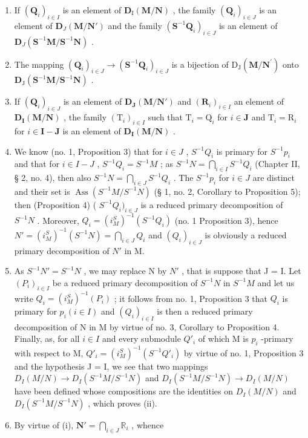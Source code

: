 \begin{enumerate}
\def\labelenumi{(\roman{enumi})}
\item
  If \((\mathbf{Q}_i)_{i\in I}\) is an element of \(\mathbf{D}_{\mathrm{I}}(\mathbf{M} / \mathbf{N})\) , the family \((\mathbf{Q}_i)_{i\in J}\) is an element of \(\mathbf{D}_{J}(\mathbf{M} / \mathbf{N}')\) and the family \((\mathbf{S}^{-1}\mathbf{Q}_i)_{i\in J}\) is an element of \(\mathbf{D}_{J}(\mathbf{S}^{-1}\mathbf{M} / \mathbf{S}^{-1}\mathbf{N})\) .
\item
  The mapping \((\mathbf{Q}_i)_{i\in J}\to (\mathbf{S}^{-1}\mathbf{Q}_i)_{i\in J}\) is a bijection of \(\mathrm{D}_{\mathrm{J}}(\mathbf{M} / \mathbf{N}^{\prime})\) onto \(\mathbf{D}_{\mathrm{J}}(\mathbf{S}^{-1}\mathbf{M} / \mathbf{S}^{-1}\mathbf{N})\) .
\item
  If \((\mathbf{Q}_i)_{i\in J}\) is an element of \(\mathbf{D}_{\mathbf{J}}(\mathbf{M} / \mathbf{N}')\) and \((\mathbf{R}_i)_{i\in I}\) an element of \(\mathbf{D}_{\mathbf{I}}(\mathbf{M} / \mathbf{N})\) , the family \((\mathrm{T}_i)_{i\in I}\) such that \(\mathrm{T}_i = \mathrm{Q}_i\) for \(i\in \mathbf{J}\) and \(\mathrm{T}_i = \mathrm{R}_i\) for \(i\in \mathbf{I} - \mathbf{J}\) is an element of \(\mathbf{D}_{\mathbf{I}}(\mathbf{M} / \mathbf{N})\) .
\item
  We know (no. 1, Proposition 3) that for \(i \in J\) , \(S^{-1}Q_{i}\) is primary for \(S^{-1}p_{i}\) and that for \(i \in I - J\) , \(S^{-1}Q_{i} = S^{-1}M\) ; as \(S^{-1}N = \bigcap_{i \in I} S^{-1}Q_{i}\) (Chapter II, § 2, no. 4), then also \(S^{-1}N = \bigcap_{i \in J} S^{-1}Q_{i}\) . The \(S^{-1}p_{i}\) for \(i \in J\) are distinct and their set is \(\operatorname{Ass}(S^{-1}M / S^{-1}N)\) (§ 1, no. 2, Corollary to Proposition 5); then (Proposition 4) ( \(S^{-1}Q_{i})_{i \in J}\) is a reduced primary decomposition of \(S^{-1}N\) . Moreover, \(Q_{i} = (i_{M}^{S})^{-1}(S^{-1}Q_{i})\) (no. 1 Proposition 3), hence \(N' = (i_{M}^{S})^{-1}(S^{-1}N) = \bigcap_{i \in J} Q_{i}\) and \((Q_{i})_{i \in J}\) is obviously a reduced primary decomposition of \(N'\) in M.
\item
  As \(S^{-1}N' = S^{-1}N\) , we may replace N by \(N'\) , that is suppose that J = I. Let \((P_i)_{i \in I}\) be a reduced primary decomposition of \(S^{-1}N\) in \(S^{-1}M\) and let us write \(Q_i = (i_M^S)^{-1}(P_i)\) ; it follows from no. 1, Proposition 3 that \(Q_i\) is primary for \(p_i (i \in I)\) and \((Q_i)_{i \in I}\) is then a reduced primary decomposition of N in M by virtue of no. 3, Corollary to Proposition 4. Finally, as, for all \(i \in I\) and every submodule \(Q'_i\) of which M is \(p_i\) -primary with respect to M, \(Q'_i = (i_M^S)^{-1}(S^{-1}Q'_i)\) by virtue of no. 1, Proposition 3 and the hypothesis J = I, we see that two mappings \(D_I(M/N) \to D_I(S^{-1}M/S^{-1}N)\) and \(D_I(S^{-1}M/S^{-1}N) \to D_I(M/N)\) have been defined whose compositions are the identities on \(D_I(M/N)\) and \(D_I(S^{-1}M/S^{-1}N)\) , which proves (ii).
\item
  By virtue of (i), \(\mathbf{N}' = \bigcap_{i\in J}\mathbb{R}_i\) , whence
\end{enumerate}

